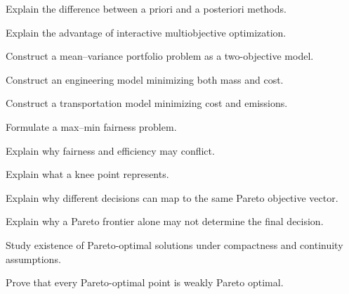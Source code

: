 \begin{exercise}[3]
Explain the difference between a priori and a posteriori methods.
\end{exercise}

\begin{exercise}[3]
Explain the advantage of interactive multiobjective optimization.
\end{exercise}

\begin{exercise}[3]
Construct a mean--variance portfolio problem as a two-objective model.
\end{exercise}

\begin{exercise}[3]
Construct an engineering model minimizing both mass and cost.
\end{exercise}

\begin{exercise}[3]
Construct a transportation model minimizing cost and emissions.
\end{exercise}

\begin{exercise}[3]
Formulate a max--min fairness problem.
\end{exercise}

\begin{exercise}[3]
Explain why fairness and efficiency may conflict.
\end{exercise}

\begin{exercise}[3]
Explain what a knee point represents.
\end{exercise}

\begin{exercise}[3]
Explain why different decisions can map to the same Pareto objective
vector.
\end{exercise}

\begin{exercise}[3]
Explain why a Pareto frontier alone may not determine the final decision.
\end{exercise}

\begin{exercise}[4]
Study existence of Pareto-optimal solutions under compactness and
continuity assumptions.
\end{exercise}

\begin{exercise}[4]
Prove that every Pareto-optimal point is weakly Pareto optimal.
\end{exercise}

